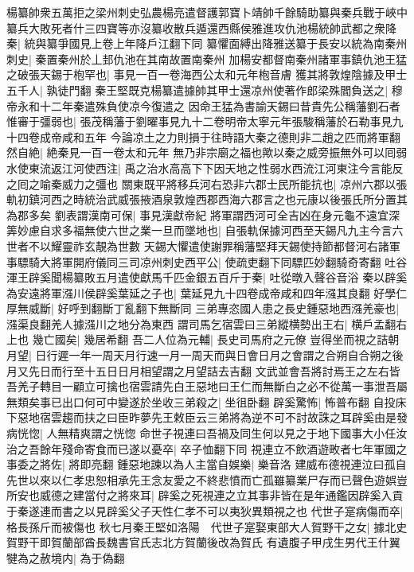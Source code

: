 楊纂帥衆五萬拒之梁州刺史弘農楊亮遣督護郭寶卜靖帥千餘騎助纂與秦兵戰于峽中纂兵大敗死者什三四寶等亦沒纂收散兵遁還西縣侯雅進攻仇池楊統帥武都之衆降秦|{
	統與纂爭國見上卷上年降戶江翻下同}
纂懼面縛出降雅送纂于長安以統為南秦州刺史|{
	秦置秦州於丄邽仇池在其南故置南秦州}
加楊安都督南秦州諸軍事鎮仇池王猛之破張天錫于枹罕也|{
	事見一百一卷海西公太和元年枹音膚}
獲其將敦煌陰據及甲士五千人|{
	孰徒門翻}
秦王堅既克楊纂遣據帥其甲士還凉州使著作郎梁殊閻負送之|{
	穆帝永和十二年秦遣殊負使凉今復遣之}
因命王猛為書諭天錫曰昔貴先公稱藩劉石者惟審于彊弱也|{
	張茂稱藩于劉曜事見九十二卷明帝太寧元年張駿稱藩於石勒事見九十四卷成帝咸和五年}
今論凉土之力則損于往時語大秦之德則非二趙之匹而將軍翻然自絶|{
	絶秦見一百一卷太和元年}
無乃非宗廟之福也歟以秦之威旁振無外可以囘弱水使東流返江河使西注|{
	禹之治水高高下下因天地之性弱水西流江河東注今言能反之囘之喻秦威力之彊也}
關東既平將移兵河右恐非六郡士民所能抗也|{
	凉州六郡以張軌初鎮河西之時統治武威張掖酒泉敦煌西郡西海六郡言之也元康以後張氏所分置其為郡多矣}
劉表謂漢南可保|{
	事見漢獻帝紀}
將軍謂西河可全吉凶在身元龜不遠宜深筭妙慮自求多福無使六世之業一旦而墜地也|{
	自張軌保據河西至天錫凡九主今言六世者不以耀靈祚玄靚為世數}
天錫大懼遣使謝罪稱藩堅拜天錫使持節都督河右諸軍事驃騎大將軍開府儀同三司凉州刺史西平公|{
	使疏吏翻下同驃匹妙翻騎奇寄翻}
吐谷渾王辟奚聞楊纂敗五月遣使獻馬千匹金銀五百斤于秦|{
	吐從暾入聲谷音浴}
秦以辟奚為安遠將軍漒川侯辟奚葉延之子也|{
	葉延見九十四卷成帝咸和四年漒其良翻}
好學仁厚無威斷|{
	好呼到翻斷丁亂翻下無斷同}
三弟專恣國人患之長史鍾惡地西漒羌豪也|{
	漒渠良翻羌人據漒川之地分為東西}
謂司馬乞宿雲曰三弟縱横勢出王右|{
	横戶孟翻右上也}
幾亡國矣|{
	幾居希翻}
吾二人位為元輔|{
	長史司馬府之元僚}
豈得坐而視之詰朝月望|{
	日行遲一年一周天月行速一月一周天而與日會日月之會謂之合朔自合朔之後月又先日而行至十五日日月相望謂之月望詰去吉翻}
文武並會吾將討焉王之左右皆吾羌子轉目一顧立可擒也宿雲請先白王惡地曰王仁而無斷白之必不從萬一事泄吾屬無類矣事已出口何可中變遂於坐收三弟殺之|{
	坐徂卧翻}
辟奚驚怖|{
	怖普布翻}
自投床下惡地宿雲趨而扶之曰臣昨夢先王敕臣云三弟將為逆不可不討故誅之耳辟奚由是發病恍惚|{
	人無精爽謂之恍惚}
命世子視連曰吾禍及同生何以見之于地下國事大小任汝治之吾餘年殘命寄食而已遂以憂卒|{
	卒子恤翻下同}
視連立不飲酒遊畋者七年軍國之事委之將佐|{
	將即亮翻}
鍾惡地諫以為人主當自娛樂|{
	樂音洛}
建威布德視連泣曰孤自先世以來以仁孝忠恕相承先王念友愛之不終悲憤而亡孤雖纂業尸存而已聲色遊娯豈所安也威德之建當付之將來耳|{
	辟奚之死視連之立其事非皆在是年通鑑因辟奚入貢于秦遂連而書之以見辟奚父子天性仁孝不可以夷狄異類視之也}
代世子寔病傷而卒|{
	格長孫斤而被傷也}
秋七月秦王堅如洛陽　代世子寔娶東部大人賀野干之女|{
	據北史賀野干即賀蘭部酋長魏書官氏志北方賀蘭後改為賀氏}
有遺腹子甲戌生男代王什翼犍為之赦境内|{
	為于偽翻}

